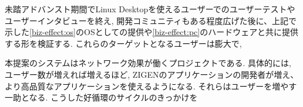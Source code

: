 未踏アドバンスト期間でLinux Desktopを使えるユーザーでのユーザーテストやユーザーインタビューを終え, 開発コミュニティもある程度広げた後に、上記で示した\ref{biz-effect:os}のOSとしての提供や\ref{biz-effect:pc}のハードウェアと共に提供する形を検証する.
これらのターゲットとなるユーザーは膨大で, 

本提案のシステムはネットワーク効果が働くプロジェクトである.
具体的には, ユーザー数が増えれば増えるほど, ZIGENのアプリケーションの開発者が増え、より高品質なアプリケーションを使えるようになる.
それらはユーザーを増やす一助となる.
こうした好循環のサイクルのきっかけを

